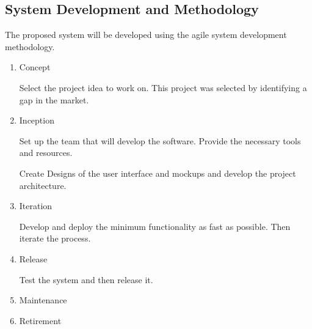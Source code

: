 \subsection{System Development and Methodology}

The proposed system will be developed using the agile system development methodology.

\begin{enumerate}
    \item Concept


          Select the project idea to work on. This project was selected by identifying a gap in the market.

    \item Inception


          Set up the team that will develop the software. Provide the necessary tools and resources.

          Create Designs of the user interface and mockups and develop the project architecture.

    \item Iteration


          Develop and deploy the minimum functionality as fast as possible. Then iterate the process.

    \item Release

          Test the system and then release it.

    \item Maintenance
    \item Retirement
\end{enumerate}
